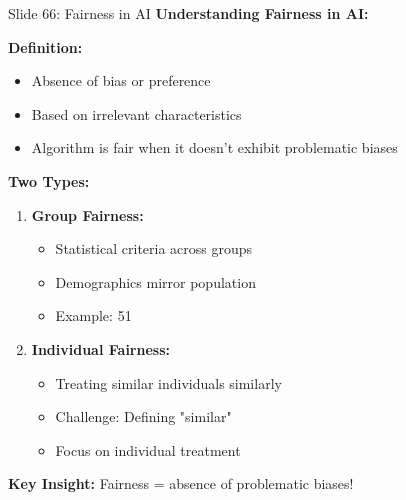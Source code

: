 \documentclass[8pt]{beamer}
\begin{document}
	\begin{frame}{Slide 66: Fairness in AI}
		\fontsize{6.5}{7.5}\selectfont
		\textbf{Understanding Fairness in AI:}
		
		\vspace{0.1cm}
		\textbf{Definition:}
		\begin{itemize}
			\item Absence of bias or preference
			\item Based on irrelevant characteristics
			\item Algorithm is fair when it doesn't exhibit problematic biases
		\end{itemize}
		
		\vspace{0.1cm}
		\textbf{Two Types:}
		\begin{enumerate}
			\item \textbf{Group Fairness:}
			\begin{itemize}
				\item Statistical criteria across groups
				\item Demographics mirror population
				\item Example: 51%
			\end{itemize}
			\item \textbf{Individual Fairness:}
			\begin{itemize}
				\item Treating similar individuals similarly
				\item Challenge: Defining "similar"
				\item Focus on individual treatment
			\end{itemize}
		\end{enumerate}
		
		\textcolor{myblue}{\textbf{Key Insight:}} Fairness = \textcolor{myblue}{absence of problematic biases}!
	\end{frame}
	
\end{document}
